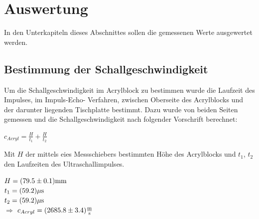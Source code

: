 \section{Auswertung}
\label{sec:auswertung}
In den Unterkapiteln dieses Abschnittes sollen die gemessenen Werte ausgewertet werden.
\subsection{Bestimmung der Schallgeschwindigkeit}
\label{sec:schallgeschwindigkeit}
Um die Schallgeschwindigkeit im Acrylblock zu bestimmen wurde die Laufzeit des Impulses, im Impuls-Echo- Verfahren, zwischen Oberseite des 
Acrylblocks und der darunter liegenden Tischplatte bestimmt. Dazu wurde von beiden Seiten gemessen und die Schallgeschwindigkeit nach folgender
Vorschrift berechnet:
\begin{center}
    $c_{Acryl}=\frac{H}{t_1}+\frac{H}{t_2}$\\
\end{center}
Mit $H$ der mittels eies Messschiebers bestimmten Höhe des Acrylblocks und $t_1$, $t_2$ den Laufzeiten des Ultraschallimpulses.
\begin{center}
    $H=(79.5\pm 0.1)\si[]{mm} $\\
    $t_1=(59.2)\si[]{\mu s}$\\
    $t_2=(59.2)\si[]{\mu s}$\\ 
    $\Rightarrow$ $c_{Acryl}=(2685.8\pm3.4)\si[]{\frac{m}{s}}$
\end{center}

